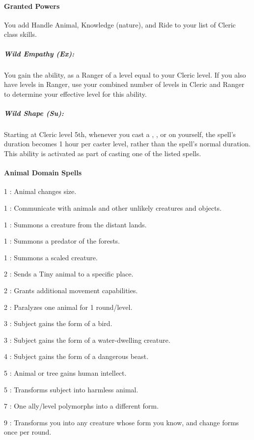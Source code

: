 \paragraph{Granted Powers}
You add Handle Animal, Knowledge (nature), and Ride to your list of Cleric class skills.
\subparagraph{Wild Empathy (Ex):}
You gain the  ability, as a Ranger of a level equal to your Cleric level.
If you also have levels in Ranger, use your combined number of levels in Cleric and Ranger to determine your effective level for this ability.
\subparagraph[Wild Shape]{Wild Shape (Su):}
\label{sec:WildShape}
Starting at Cleric level 5th, whenever you cast a , , 
 or  on yourself, 
the spell's duration becomes 1 hour per caster level, rather than the spell's normal duration.
This ability is activated as part of casting one of the listed spells.
\paragraph{Animal Domain Spells}
\begin{list}{}{\leftmargin=1em}
\item[1] : Animal changes size.
\item[1] : Communicate with animals and other unlikely creatures and objects.
\item[1] : Summons a creature from the distant lands.
\item[1] : Summons a predator of the forests.
\item[1] : Summons a scaled creature.
\item[2] : Sends a Tiny animal to a specific place.
\item[2] : Grants additional movement capabilities.
\item[2] : Paralyzes one animal for 1 round/level.
\item[3] : Subject gains the form of a bird.
\item[3] : Subject gains the form of a water-dwelling creature.
\item[4] : Subject gains the form of a dangerous beast.
\item[5] : Animal or tree gains human intellect.
\item[5] : Transforms subject into harmless animal.
\item[7] : One ally/level polymorphs into a different form.
\item[9] : Transforms you into any creature whose form you know, and change forms once per round.
\end{list}
